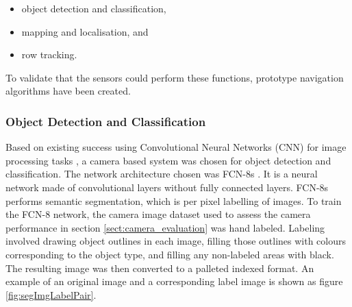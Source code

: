 \documentclass[preprint,authoryear,12pt]{elsarticle}
\begin{document}
    \begin{itemize}
        \item object detection and classification,
        \item mapping and localisation, and
        \item row tracking.
    \end{itemize}
    To validate that the sensors could perform these functions, prototype navigation algorithms have been created.

    \subsubsection{Object Detection and Classification}

        Based on existing success using Convolutional Neural Networks (CNN) for image processing tasks \citep{LeCun2015}, a camera based system was chosen for object detection and classification.
    	The network architecture chosen was FCN-8s \citep{long2015}.
        It is a neural network made of convolutional layers without fully connected layers.
    	FCN-8s performs semantic segmentation, which is per pixel labelling of images.
        To train the FCN-8 network, the camera image dataset used to assess the camera performance in section \ref{sect:camera_evaluation} was hand labeled.
    	Labeling involved drawing object outlines in each image, filling those outlines with colours corresponding to the object type, and filling any non-labeled areas with black.
        The resulting image was then converted to a palleted indexed format.
    	An example of an original image and a corresponding label image is shown as figure \ref{fig:segImgLabelPair}.
\end{document}
